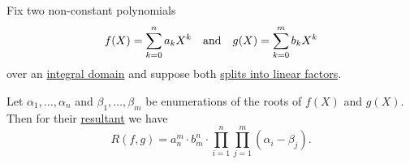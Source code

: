 \begin{proposition}\label{thm:resultant_as_product}
  Fix two non-constant polynomials
  \begin{align*}
    f(X) = \sum_{k=0}^n a_k X^k
    &&\T{and}&&
    g(X) = \sum_{k=0}^m b_k X^k
  \end{align*}
  over an \hyperref[def:integral_domain]{integral domain} and suppose both \hyperref[def:polynomial_splits_into_linear_factors]{splits into linear factors}.

  Let \( \alpha_1, \ldots, \alpha_n \) and \( \beta_1, \ldots, \beta_m \) be enumerations of the roots of \( f(X) \) and \( g(X) \). Then for their \hyperref[def:resultant]{resultant} we have
  \begin{equation}\label{eq:thm:resultant_as_product}
    R(f, g) = a_n^m \cdot b_m^n \cdot \prod_{i=1}^n \prod_{j=1}^m (\alpha_i - \beta_j).
  \end{equation}
\end{proposition}
